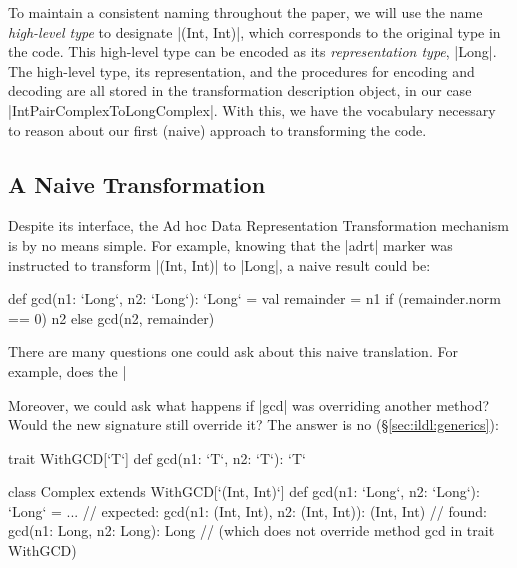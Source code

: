 To maintain a consistent naming throughout the paper, we will
use the name \emph{high-level type} to designate |(Int, Int)|, which
corresponds to the original type in the code. This high-level type can
be encoded as its \emph{representation type}, |Long|. The high-level
type, its representation, and the procedures for encoding and decoding
are all stored in the transformation description object, in our case
|IntPairComplexToLongComplex|. With this, we have the vocabulary
necessary to reason about our first (naive) approach to transforming
the code.

\subsection{A Naive Transformation}

Despite its interface, the Ad hoc Data Representation Transformation mechanism is by no means simple. For example, knowing that the |adrt| marker was instructed to transform |(Int, Int)| to |Long|, a naive result could be:

\begin{lstlisting-nobreak}
def gcd(n1: `Long`, n2: `Long`): `Long` = {
  val remainder = n1 %
  if (remainder.norm == 0) n2 else gcd(n2, remainder)
}
\end{lstlisting-nobreak}

There are many questions one could ask about this naive translation. For example, does the |%

Moreover, we could ask what happens if |gcd| was overriding another method? Would the new signature still override it? The answer is no (\S\ref{sec:ildl:generics}):

\begin{lstlisting-nobreak}
trait WithGCD[`T`] {
  def gcd(n1: `T`, n2: `T`): `T`
}

class Complex extends WithGCD[`(Int, Int)`] {
  def gcd(n1: `Long`, n2: `Long`): `Long` = ...
  // expected: gcd(n1: (Int, Int), n2: (Int, Int)): (Int, Int)
  // found:    gcd(n1: Long, n2: Long): Long
  // (which does not override method gcd in trait WithGCD)
}
\end{lstlisting-nobreak}
%

